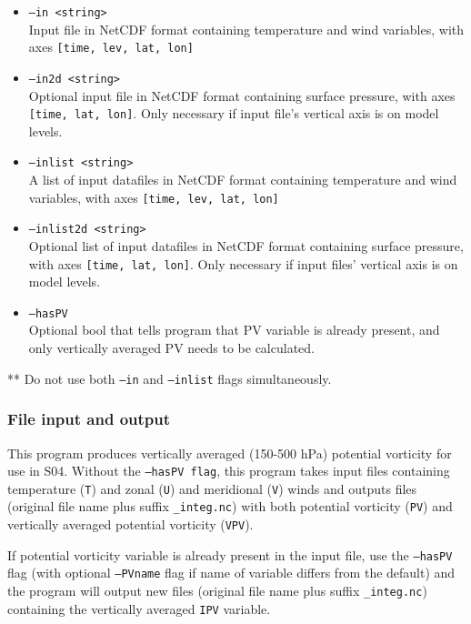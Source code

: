 \documentclass{article}
\begin{document}
\begin{itemize}
\item[]\texttt{--in <string>} \\ Input file in NetCDF format containing temperature and wind variables, with axes \texttt{[time, lev, lat, lon]}
\item[]\texttt{--in2d <string>} \\ Optional input file in NetCDF format containing surface pressure, with axes \texttt{[time, lat, lon]}. Only necessary if input file's vertical axis is on model levels.
\item[]\texttt{--inlist <string>} \\ A list of input datafiles in NetCDF format containing temperature and wind variables, with axes \texttt{[time, lev, lat, lon]}
\item[]\texttt{--inlist2d <string>} \\ Optional list of input datafiles in NetCDF format containing surface pressure, with axes \texttt{[time, lat, lon]}. Only necessary if input files' vertical axis is on model levels.
\item[]\texttt{--hasPV} \\ Optional bool that tells program that PV variable is already present, and only vertically averaged PV needs to be calculated.
\end{itemize}

** Do not use both \texttt{--in} and \texttt{--inlist} flags simultaneously.



\subsubsection{File input and output}

This program produces vertically averaged (150-500 hPa) potential vorticity for use in S04. Without the \texttt{--hasPV flag}, this program takes input files containing temperature (\texttt{T}) and zonal (\texttt{U}) and meridional (\texttt{V}) winds and outputs files  (original file name plus suffix \texttt{\_integ.nc}) with both potential vorticity (\texttt{PV}) and vertically averaged potential vorticity (\texttt{VPV}). 

If potential vorticity variable is already present in the input file,  use the \texttt{--hasPV} flag (with optional \texttt{--PVname} flag if name of variable differs from the default) and the program will output new files (original file name plus suffix \texttt{\_integ.nc}) containing the vertically averaged \texttt{IPV} variable.
\end{document}
